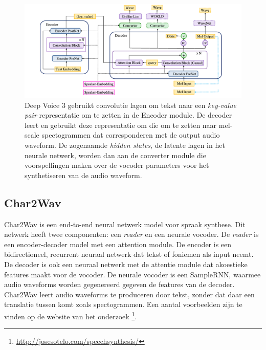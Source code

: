 \begin{figure}[H]
    \centering
    \includegraphics[width=\textwidth]{figures/deepvoice.png}
    \caption{Deep Voice 3 gebruikt convolutie lagen om tekst naar een \textit{key-value pair} representatie om te zetten in de Encoder module. De decoder leert en gebruikt deze representatie om die om te zetten naar mel-scale spectogrammen dat corresponderen met de output audio waveform. De zogenaamde \textit{hidden states}, de latente lagen in het neurale netwerk, worden dan aan de converter module die voorspellingen maken over de vocoder parameters voor het synthetiseren van de audio waveform.}
    \label{fig:deepvoice}
\end{figure}

\subsection{Char2Wav}
Char2Wav is een end-to-end neural netwerk model voor spraak synthese\cite{sotelo2017char2wav}. Dit netwerk heeft twee componenten: een \textit{reader} en een neurale vocoder. De \textit{reader} is een encoder-decoder model met een attention module. De encoder is een bidirectioneel, recurrent neuraal netwerk dat tekst of foniemen als input neemt. De decoder is ook een neuraal netwerk met de attentie module dat akoestieke features maakt voor de vocoder. De neurale vocoder is een SampleRNN, waarmee audio waveforms worden gegenereerd gegeven de features van de decoder. Char2Wav leert audio waveforms te produceren door tekst, zonder dat daar een translatie tussen komt zoals spectogrammen. Een aantal voorbeelden zijn te vinden op de website van het onderzoek \footnote{\url{http://josesotelo.com/speechsynthesis/}}.

